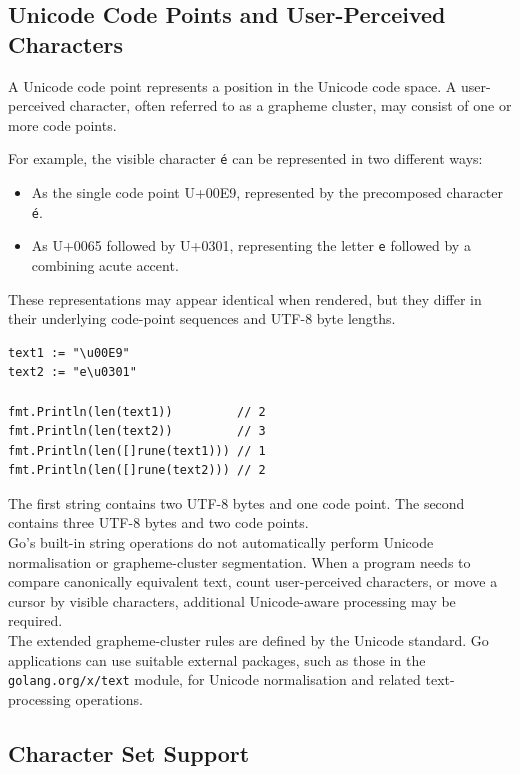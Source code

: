 \subsection{Unicode Code Points and User-Perceived Characters}

A Unicode code point represents a position in the Unicode code space. A user-perceived character, often referred to as a grapheme cluster, may consist of one or more code points.

For example, the visible character \texttt{é} can be represented in two different ways:

\begin{itemize}
    \item As the single code point U+00E9, represented by the precomposed character \texttt{é}.
    \item As U+0065 followed by U+0301, representing the letter \texttt{e} followed by a combining acute accent.
\end{itemize}

These representations may appear identical when rendered, but they differ in their underlying code-point sequences and UTF-8 byte lengths.

\begin{lstlisting}
text1 := "\u00E9"
text2 := "e\u0301"

fmt.Println(len(text1))         // 2
fmt.Println(len(text2))         // 3
fmt.Println(len([]rune(text1))) // 1
fmt.Println(len([]rune(text2))) // 2
\end{lstlisting}

The first string contains two UTF-8 bytes and one code point. The second contains three UTF-8 bytes and two code points.\\

Go's built-in string operations do not automatically perform Unicode normalisation or grapheme-cluster segmentation. When a program needs to compare canonically equivalent text, count user-perceived characters, or move a cursor by visible characters, additional Unicode-aware processing may be required.\\

The extended grapheme-cluster rules are defined by the Unicode standard. Go applications can use suitable external packages, such as those in the \texttt{golang.org/x/text} module, for Unicode normalisation and related text-processing operations.

\subsection{Character Set Support}

